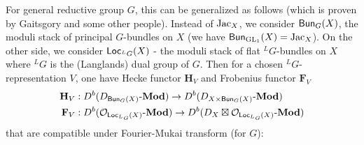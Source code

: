 For general reductive group $G$, this can be generalized as follows (which is proven by Gaitsgory and some other people).
Instead of $\operatorname{\mathrm{Jac}}_X$, we consider $\operatorname{\mathsf{Bun}}_G(X)$, the moduli stack of principal $G$-bundles on $X$ (we have $\operatorname{\mathsf{Bun}}_{\operatorname{\mathrm{GL}}_1}(X) = \operatorname{\mathrm{Jac}}_X$).
On the other side, we consider $\operatorname{\mathsf{Loc}}_{{}^{L}G}(X)$ - the moduli stack of flat ${}^{L}G$-bundles on $X$ where ${}^{L}G$ is the (Langlands) dual group of $G$.
Then for a chosen ${}^{L}G$-representation $V$, one have Hecke functor $\mathbf{H}_V$ and Frobenius functor $\mathbf{F}_V$
\begin{align*}
    \mathbf{H}_V &: D^{b}(D_{\operatorname{\mathsf{Bun}}_G(X)}\text{-}\mathbf{Mod}) \to D^{b}(D_{X \times \operatorname{\mathsf{Bun}}_G(X)}\text{-}\mathbf{Mod}) \\
    \mathbf{F}_V &: D^{b}(\mathcal{O}_{\operatorname{\mathsf{Loc}}_{{}^{L}G}(X)}\text{-}\mathbf{Mod}) \to D^{b}(D_X \boxtimes \mathcal{O}_{\operatorname{\mathsf{Loc}}_{{}^{L}G}(X)}\text{-}\mathbf{Mod})
\end{align*}
that are compatible under Fourier-Mukai transform (for $G$):

\begin{center}
\end{center}